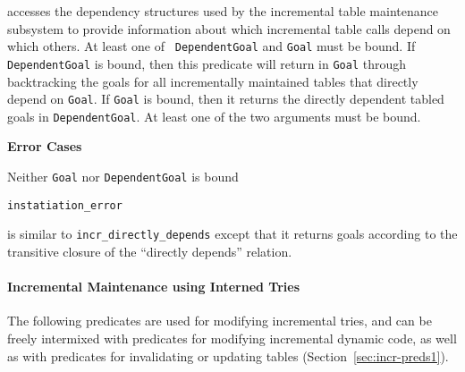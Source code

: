 \begin{description}
accesses the dependency structures used by the incremental table
maintenance subsystem to provide information about which incremental
table calls depend on which others.  At least one of {\tt
  DependentGoal} and {\tt Goal} must be bound.  If {\tt DependentGoal}
is bound, then this predicate will return in {\tt Goal} through
backtracking the goals for all incrementally maintained tables that
directly depend on {\tt Goal}.  If {\tt Goal} is bound, then it
returns the directly dependent tabled goals in {\tt DependentGoal}.
At least one of the two arguments must be bound.

{\bf Error Cases}
\bi
\item 	Neither {\tt Goal} nor {\tt DependentGoal} is bound
\bi
\item 	{\tt instatiation\_error}
\ei
\ei

is similar to {\tt incr\_directly\_depends} except that it returns
goals according to the transitive closure of the ``directly depends''
relation.
\end{description}

\paragraph{Incremental Maintenance using Interned Tries}
The following predicates are used for modifying incremental tries, and
can be freely intermixed with predicates for modifying incremental
dynamic code, as well as with predicates for invalidating or updating
tables (Section~\ref{sec:incr-preds1}).


